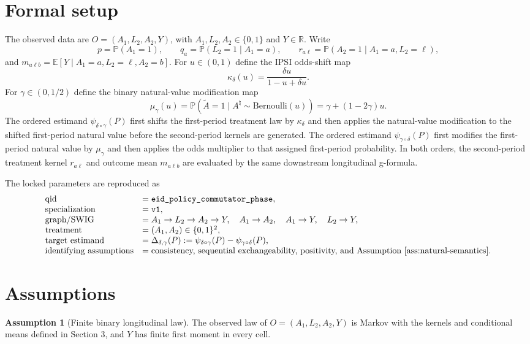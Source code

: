 \documentclass[11pt]{article}
\newcommand{\E}{\mathbb{E}}
\renewcommand{\Pr}{\mathbb{P}}
\theoremstyle{definition}
\newtheorem{assumption}{Assumption}
\theoremstyle{plain}
\theoremstyle{remark}
\begin{document}
\section{Formal setup}
The observed data are \(O=(A_1,L_2,A_2,Y)\), with \(A_1,L_2,A_2\in\{0,1\}\) and \(Y\in\mathbb{R}\). Write
\[
p=\Pr(A_1=1),\qquad q_a=\Pr(L_2=1\mid A_1=a),\qquad r_{a\ell}=\Pr(A_2=1\mid A_1=a,L_2=\ell),
\]
and \(m_{a\ell b}=\E[Y\mid A_1=a,L_2=\ell,A_2=b]\). For \(u\in(0,1)\) define the IPSI odds-shift map
\[
\kappa_\delta(u)=\frac{\delta u}{1-u+\delta u}.
\]
For \(\gamma\in(0,1/2)\) define the binary natural-value modification map
\[
\mu_\gamma(u)=\Pr(\widetilde A=1\mid A^{\natural}\sim\mathrm{Bernoulli}(u))
=\gamma+(1-2\gamma)u.
\]
The ordered estimand \(\psi_{\delta\circ\gamma}(P)\) first shifts the first-period treatment law by \(\kappa_\delta\) and then applies the natural-value modification to the shifted first-period natural value before the second-period kernels are generated. The ordered estimand \(\psi_{\gamma\circ\delta}(P)\) first modifies the first-period natural value by \(\mu_\gamma\) and then applies the odds multiplier to that assigned first-period probability. In both orders, the second-period treatment kernel \(r_{a\ell}\) and outcome mean \(m_{a\ell b}\) are evaluated by the same downstream longitudinal g-formula.

The locked parameters are reproduced as
\[
\begin{array}{ll}
\text{qid} & = \texttt{eid\_policy\_commutator\_phase},\\
\text{specialization} & = \texttt{v1},\\
\text{graph/SWIG} & = A_1 \to L_2 \to A_2 \to Y,\quad A_1 \to A_2,\quad A_1 \to Y,\quad L_2 \to Y,\\
\text{treatment} & = (A_1,A_2)\in\{0,1\}^2,\\
\text{target estimand} & =
\Delta_{\delta,\gamma}(P):=\psi_{\delta\circ\gamma}(P)-\psi_{\gamma\circ\delta}(P),\\
\text{identifying assumptions} & =
\text{consistency, sequential exchangeability, positivity, and Assumption \ref{ass:natural-semantics}.}
\end{array}
\]

\section{Assumptions}
\begin{assumption}[Finite binary longitudinal law]\label{ass:finite-law}
The observed law of \(O=(A_1,L_2,A_2,Y)\) is Markov with the kernels and conditional means defined in Section 3, and \(Y\) has finite first moment in every cell.
\end{assumption}
\end{document}
